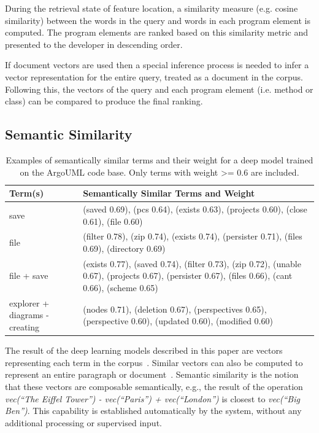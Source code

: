 During the retrieval state of feature location, a similarity measure (e.g.
cosine similarity) between the words in the query and words in each program
element is computed. The program elements are ranked based on this similarity
metric and presented to the developer in descending order.

If document vectors are used then a special inference process is needed to infer
a vector representation for the entire query, treated as a document in the
corpus. Following this, the vectors of the query and each program element (i.e.
method or class) can be compared to produce the final ranking.

\subsection{Semantic Similarity}


\begin{table}[t]
\centering
\small
\caption{Examples of semantically similar terms and their weight for a deep model trained on
the ArgoUML code base. Only terms with weight >= 0.6 are included.}
\label{tab:semsim}
\begin{tabular}{p{}p{}}
\toprule
Term(s) & Semantically Similar Terms and Weight\\ 
\midrule
save & (saved 0.69), (pcs 0.64), (exists 0.63), (projects 0.60), (close 0.61), (file 0.60) \\ \hline
file & (filter 0.78), (zip 0.74), (exists 0.74), (persister 0.71), (files 0.69), (directory 0.69) \\ \hline
file + save & (exists 0.77), (saved 0.74), (filter 0.73), (zip 0.72), (unable 0.67), (projects 0.67), (persister 0.67), (files 0.66), (cant 0.66), (scheme 0.65) \\ \hline
explorer + diagrams - creating & (nodes 0.71), (deletion 0.67), (perspectives 0.65), (perspective 0.60), (updated 0.60), (modified 0.60)\\
\bottomrule
\end{tabular}
\end{table}

The result of the deep learning models described in this paper are vectors
representing each term in the corpus~\cite{mikolov_distributed_2013}. Similar
vectors can also be computed to represent an entire paragraph or
document~\cite{le_distributed_2014}. Semantic similarity is the notion that
these vectors are composable semantically, e.g., the result of the operation
{\em vec(``The Eiffel Tower'') - vec(``Paris'') + vec(``London'')} is closest to
{\em vec(``Big Ben'')}. This capability is established automatically by the
system, without any additional processing or supervised input.

